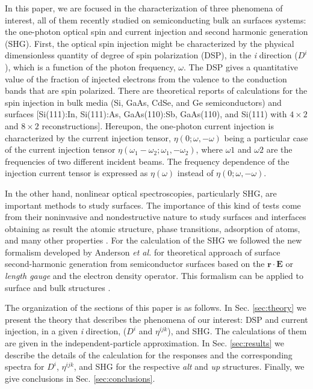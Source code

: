\documentclass[aps,pra,11pt,tightenlines,showpacs,superscriptaddress,groupedaddress]{revtex4-1}
\begin{document}
In this paper, we are focused in the characterization of three phenomena of
interest, all of them recently studied on semiconducting bulk an surfaces
systems: the one-photon optical spin and current injection and  second
harmonic generation (SHG). First, the optical spin injection might be
characterized by the physical dimensionless quantity of degree of spin
polarization (DSP), in the \emph{i} direction ($D^{i}$), which is a function of
the photon frequency, $\omega$. The DSP gives a quantitative value of the
fraction of injected electrons from the valence to the conduction bands that
are spin polarized. There are theoretical reports of calculations for the spin
injection in bulk media  (Si, GaAs, CdSe, and Ge semiconductors)
\cite{nastos2007full,cabellos2009stress,rioux2010optical} and surfaces
[Si(111):In, Si(111):As, GaAs(110):Sb, GaAs(110), and Si(111) with $4\times2$
and $8\times2$ reconstructions]\cite{mendoza2012optical,arzate2014optical}.
Hereupon, the one-photon current injection is characterized by the current
injection tensor, $\eta(0;\omega,-\omega)$  being a particular case of the
current injection tensor $\eta(\omega_{1}-\omega_{2};\omega_{1},-\omega_{2})$,
where $\omega{1}$ and $\omega{2}$ are the frequencies of two different incident
beams. The frequency dependence of the injection current tensor is expressed as
$\eta(\omega)$ instead of $\eta(0;\omega,-\omega)$.

In the other hand, nonlinear optical spectroscopies, particularly SHG, are
important methods to study surfaces. The importance of this kind of tests come
from their noninvasive and nondestructive nature to study surfaces and
interfaces obtaining as result the atomic structure, phase transitions,
adsorption of atoms, and many other properties \cite{dadap1997second,
daum1993identification,mcgilp1994probing,power1995resonant,
godefroy1996electric,salazar2014molecular,chen1981surface,
mendoza1998microscopic}. For the calculation of the SHG we followed the new
formalism developed by Anderson \emph{et al.} for theoretical approach of
surface second-harmonic generation from semiconductor surfaces
\cite{anderson2015theory} based on the $\mathbf{r}\cdot\mathbf{E} $ or
\textit{length gauge} and the electron density operator. This formalism can be
applied to surface and bulk structures \cite{anderson2015theory,sipe2000second}.

The organization of the sections of this paper is as follows. In Sec. \ref{sec:theory}
we present the theory that describes the phenomena of our interest: DSP and current injection, in a given
\emph{i} direction, ($D^{i}$ and $\eta^{ijk}$), and SHG. The calculations of them
are given in the independent-particle approximation. In Sec.
\ref{sec:results} we describe the details of the calculation for the responses
and the corresponding spectra for  $D^{i}$, $\eta^{ijk}$, and SHG for the
respective \emph{alt} and \emph{up} structures. Finally, we give conclusions in
Sec. \ref{sec:conclusions}.
\end{document}
